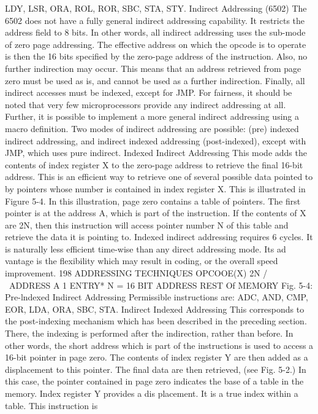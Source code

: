 LDY, LSR, ORA, ROL, ROR, SBC, STA, STY.
Indirect Addressing (6502)
The 6502 does not have a fully general indirect addressing
capability. It restricts the address field to 8 bits. In other words,
all indirect addressing uses the sub-mode of zero page addressing.
The effective address on which the opcode is to operate is then the
16 bits specified by the zero-page address of the instruction. Also,
no further indirection may occur. This means that an address
retrieved from page zero must be used as is, and cannot be used as
a further indirection.
Finally, all indirect accesses must be indexed, except for JMP.
For fairness, it should be noted that very few microprocessors
provide any indirect addressing at all. Further, it is possible to
implement a more general indirect addressing using a macro
definition.
Two modes of indirect addressing are possible: (pre) indexed indirect
addressing, and indirect indexed addressing (post-indexed), except
with JMP, which uses pure indirect.
Indexed Indirect Addressing
This mode adds the contents of index register X to the zero-page
address to retrieve the final 16-bit address. This is an efficient way to
retrieve one of several possible data pointed to by pointers whose
number is contained in index register X. This is illustrated in Figure
5-4.
In this illustration, page zero contains a table of pointers. The
first pointer is at the address A, which is part of the instruction. If
the contents of X are 2N, then this instruction will access pointer
number N of this table and retrieve the data it is pointing to.
Indexed indirect addressing requires 6 cycles. It is naturally
less efficient time-wise than any direct addressing mode. Its ad
vantage is the flexibility which may result in coding, or the overall
speed improvement.
198
ADDRESSING TECHNIQUES
OPCOOE(X)
2N
/
\
ADDRESS A
1
ENTRY* N
= 16 BIT ADDRESS
REST Of
MEMORY
Fig. 5-4: Pre-lndexed Indirect Addressing
Permissible instructions are: ADC, AND, CMP, EOR, LDA,
ORA, SBC, STA.
Indirect Indexed Addressing
This corresponds to the post-indexing mechanism which has
been described in the preceding section. There, the indexing is
performed after the indirection, rather than before. In other
words, the short address which is part of the instructions is used
to access a 16-bit pointer in page zero. The contents of index
register Y are then added as a displacement to this pointer. The
final data are then retrieved, (see Fig. 5-2.)
In this case, the pointer contained in page zero indicates the
base of a table in the memory. Index register Y provides a dis
placement. It is a true index within a table. This instruction is
